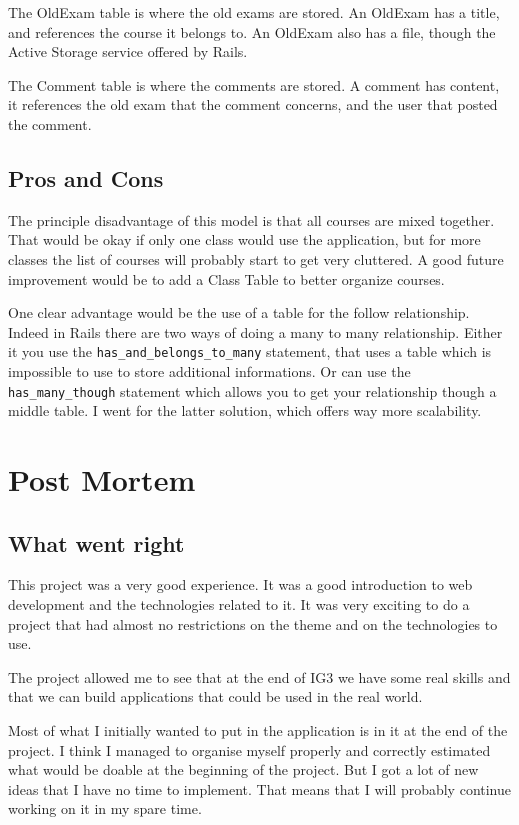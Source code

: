 \documentclass[12pt,a4paper]{article}
\begin{document}
The OldExam table is where the old exams are stored. An OldExam has a title,
and references the course it belongs to. An OldExam also has a file, though the
Active Storage service offered by Rails.

The Comment table is where the comments are stored. A comment has content, it
references the old exam that the comment concerns, and the user that posted the
comment.

\subsection{Pros and Cons}


The principle disadvantage of this model is that all courses are mixed
together. That would be okay if only one class would use the application, but
for more classes the list of courses will probably start to get very cluttered.
A good future improvement would be to add a Class Table to better organize
courses.

One clear advantage would be the use of a table for the follow relationship.
Indeed in Rails there are two ways of doing a many to many relationship. Either
it you use the \lstinline{has_and_belongs_to_many} statement, that uses a table
which is impossible to use to store additional informations. Or can use the
\lstinline{has_many_though} statement which allows you to get your relationship
though a middle table. I went for the latter solution, which offers way more
scalability.


\section{Post Mortem}


\subsection{What went right}

This project was a very good experience. It was a good introduction to web
development and the technologies related to it. It was very exciting to do a
project that had almost no restrictions on the theme and on the technologies to
use.

The project allowed me to see that at the end of IG3 we have some real skills
and that we can build applications that could be used in the real world.

Most of what I initially wanted to put in the application is in it at the end
of the project. I think I managed to organise myself properly and correctly
estimated what would be doable at the beginning of the project. But I got a lot
of new ideas that I have no time to implement. That means that I will probably
continue working on it in my spare time.
\end{document}
